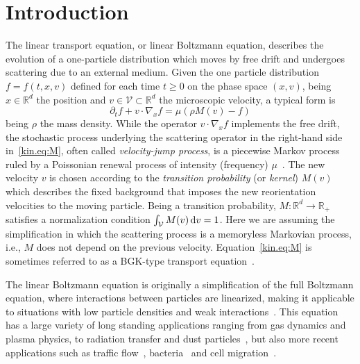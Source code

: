 \documentclass[a4paper]{article}
\theoremstyle{Theorem}\newtheorem{proposition}{Proposition}[section]
\theoremstyle{Remark}\newtheorem{remark}{Remark}[section]
\theoremstyle{Theorem}\newtheorem{theorem}{Theorem}[section]
\newcommand{\R}{\mathbb{R}}
\newcommand{\intV}{\int_{\mathcal{V}}}
\begin{document}

\section{Introduction}
The linear  transport equation, or linear Boltzmann equation, describes the evolution of a one-particle distribution which moves by free drift and undergoes scattering due to an external medium. 
Given the one particle distribution $f=f(t,x,v)$ defined for each time $t\ge 0$ on the phase space $(x,v)$, being $x\in \R^d$ the position and $v \in \mathcal{V}\subset \R^d$ the microscopic velocity, a typical form is
\begin{equation}\label{kin.eq:M}
    \partial_t f +v\cdot \nabla_x f =\mu (\rho M(v)-f)
\end{equation}
being $\rho$ the mass density. While the operator $v\cdot \nabla_x f$ implements the free drift, the stochastic process underlying the scattering operator in the right-hand side in~\eqref{kin.eq:M}, often called \textit{velocity-jump process}, is a piecewise Markov process ruled by a Poissonian renewal process of intensity (frequency) $\mu$~\cite{gardiner,Risken1996}. The new velocity $v$ is chosen according to the \textit{transition probability} (or \textit{kernel}) $M(v)$ which describes the fixed background that imposes the new reorientation velocities to the moving particle. Being a transition probability, $M:\R^d \to \R_+$ satisfies a normalization condition $\intV M(v) \, {\rm d}v =1$. Here we are assuming the simplification in which the scattering process is a memoryless Markovian process, i.e., $M$ does not depend on the previous velocity. Equation~\eqref{kin.eq:M} is sometimes referred to as a BGK-type transport equation~\cite{Cercignani,BC}.  

The linear Boltzmann equation is originally a simplification of the full Boltzmann equation, where interactions between particles are linearized, making it applicable to situations with low particle densities and weak interactions~\cite{Cercignani}. This equation has a large variety of long standing applications ranging from  gas dynamics and plasma physics, to radiation transfer and dust
particles~\cite{Cercignani,lods2004JSP,dautray1990}, but also more recent applications such as traffic flow~\cite{puppo2017KRM,visconti2017MMS}, bacteria~\cite{calvez2015KRM,bouin2015ARMA} and cell migration~\cite{stroock1974ZWVG,alt1980JMB,hillen2000SIAP,hillen2006JMB}. 
\end{document}
